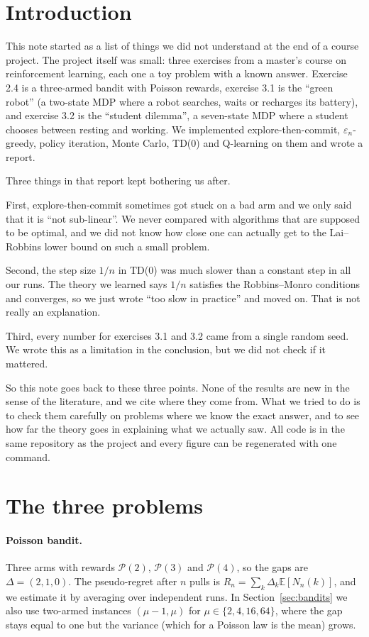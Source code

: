 \section{Introduction}

This note started as a list of things we did not understand at the end of a course project. The project itself was small: three exercises from a master's course on reinforcement learning, each one a toy problem with a known answer. Exercise 2.4 is a three-armed bandit with Poisson rewards, exercise 3.1 is the ``green robot'' (a two-state MDP where a robot searches, waits or recharges its battery), and exercise 3.2 is the ``student dilemma'', a seven-state MDP where a student chooses between resting and working. We implemented explore-then-commit, $\varepsilon_n$-greedy, policy iteration, Monte Carlo, TD(0) and Q-learning on them and wrote a report.

Three things in that report kept bothering us after.

First, explore-then-commit sometimes got stuck on a bad arm and we only said that it is ``not sub-linear''. We never compared with algorithms that are supposed to be optimal, and we did not know how close one can actually get to the Lai--Robbins lower bound on such a small problem.

Second, the step size $1/n$ in TD(0) was much slower than a constant step in all our runs. The theory we learned says $1/n$ satisfies the Robbins--Monro conditions and converges, so we just wrote ``too slow in practice'' and moved on. That is not really an explanation.

Third, every number for exercises 3.1 and 3.2 came from a single random seed. We wrote this as a limitation in the conclusion, but we did not check if it mattered.

So this note goes back to these three points. None of the results are new in the sense of the literature, and we cite where they come from. What we tried to do is to check them carefully on problems where we know the exact answer, and to see how far the theory goes in explaining what we actually saw. All code is in the same repository as the project and every figure can be regenerated with one command.

\section{The three problems}
\label{sec:setup}

\paragraph{Poisson bandit.} Three arms with rewards $\mathcal P(2)$, $\mathcal P(3)$ and $\mathcal P(4)$, so the gaps are $\Delta = (2, 1, 0)$. The pseudo-regret after $n$ pulls is $R_n = \sum_k \Delta_k \mathbb E[N_n(k)]$, and we estimate it by averaging over independent runs. In Section~\ref{sec:bandits} we also use two-armed instances $(\mu - 1, \mu)$ for $\mu \in \{2, 4, 16, 64\}$, where the gap stays equal to one but the variance (which for a Poisson law is the mean) grows.

